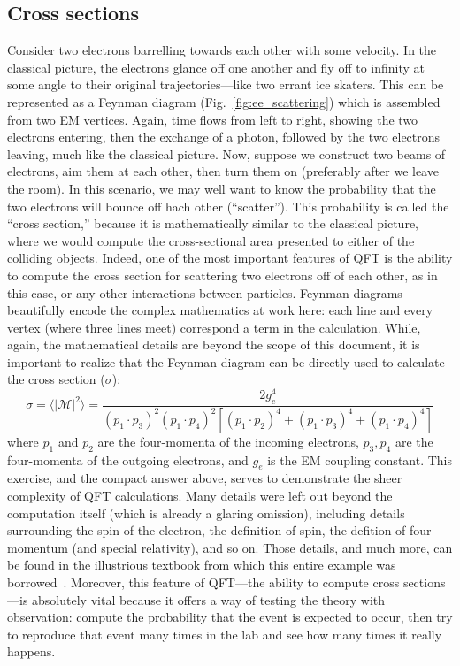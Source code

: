 \subsection{Cross sections}
Consider two electrons barrelling towards each other with some velocity. 
In the classical picture, the electrons glance off one another and fly off to infinity at some angle to their original trajectories---like two errant ice skaters. 
This can be represented as a Feynman diagram (Fig.~\ref{fig:ee_scattering}) which is assembled from two EM vertices. 
Again, time flows from left to right, showing the two electrons entering, then the exchange of a photon, followed by the two electrons leaving, much like the classical picture. 
Now, suppose we construct two beams of electrons, aim them at each other, then turn them on (preferably after we leave the room). 
In this scenario, we may well want to know the probability that the two electrons will bounce off hach other (``scatter''). 
This probability is called the ``cross section,'' because it is mathematically similar to the classical picture\footnotemark{}, where we would compute the cross-sectional area presented to either of the colliding objects. 
Indeed, one of the most important features of QFT is the ability to compute the cross section for scattering two electrons off of each other, as in this case, or any other interactions between particles. 
Feynman diagrams beautifully encode the complex mathematics at work here: each line and every vertex (where three lines meet) correspond a term in the calculation. 
While, again, the mathematical details are beyond the scope of this document, it is important to realize that the Feynman diagram can be directly used to calculate the cross section ($\sigma$):
\begin{equation}
    \sigma = \langle|\mathcal{M}|^2\rangle = \frac{2g_e^4}{(p_1 \cdot p_3)^2(p_1 \cdot p_4)^2[(p_1 \cdot p_2)^4 + (p_1 \cdot p_3)^4 + (p_1 \cdot p_4)^4]}
\end{equation}
where $p_1$ and $p_2$ are the four-momenta of the incoming electrons, $p_3, p_4$ are the four-momenta of the outgoing electrons, and $g_e$ is the EM coupling constant. 
This exercise, and the compact answer above, serves to demonstrate the sheer complexity of QFT calculations. 
Many details were left out beyond the computation itself (which is already a glaring omission), including details surrounding the spin of the electron, the definition of spin, the defition of four-momentum (and special relativity), and so on. 
Those details, and much more, can be found in the illustrious textbook from which this entire example was borrowed~\cite{GriffithsParticle}. 
Moreover, this feature of QFT---the ability to compute cross sections---is absolutely vital because it offers a way of testing the theory with observation: compute the probability that the event is expected to occur, then try to reproduce that event many times in the lab and see how many times it really happens. 

